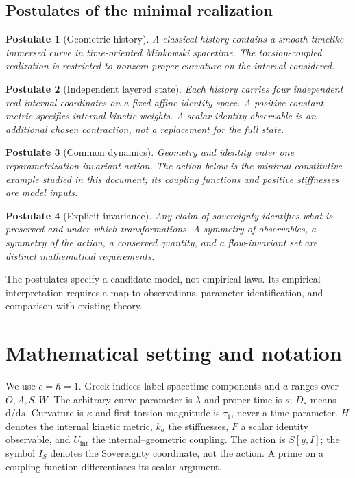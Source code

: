 \documentclass[11pt]{article}
\newcommand{\dd}{\mathrm d}
\newcommand{\Ds}{D_s}
\newcommand{\U}{U_{\mathrm{int}}}
\newtheorem{postulate}{Postulate}
\begin{document}
\subsection{Postulates of the minimal realization}
\begin{postulate}[Geometric history]
A classical history contains a smooth timelike immersed curve in time-oriented Minkowski spacetime. The torsion-coupled realization is restricted to nonzero proper curvature on the interval considered.
\end{postulate}
\begin{postulate}[Independent layered state]
Each history carries four independent real internal coordinates on a fixed affine identity space. A positive constant metric specifies internal kinetic weights. A scalar identity observable is an additional chosen contraction, not a replacement for the full state.
\end{postulate}
\begin{postulate}[Common dynamics]
Geometry and identity enter one reparametrization-invariant action. The action below is the minimal constitutive example studied in this document; its coupling functions and positive stiffnesses are model inputs.
\end{postulate}
\begin{postulate}[Explicit invariance]
Any claim of sovereignty identifies what is preserved and under which transformations. A symmetry of observables, a symmetry of the action, a conserved quantity, and a flow-invariant set are distinct mathematical requirements.
\end{postulate}
The postulates specify a candidate model, not empirical laws. Its empirical interpretation requires a map to observations, parameter identification, and comparison with existing theory.

\section{Mathematical setting and notation}
We use $c=\hbar=1$. Greek indices label spacetime components and $a$ ranges over $O,A,S,W$. The arbitrary curve parameter is $\lambda$ and proper time is $s$; $\Ds$ means $\dd/\dd s$. Curvature is $\kappa$ and first torsion magnitude is $\tau_1$, never a time parameter. $H$ denotes the internal kinetic metric, $k_a$ the stiffnesses, $F$ a scalar identity observable, and $\U$ the internal--geometric coupling. The action is $S[y,I]$; the symbol $I_S$ denotes the Sovereignty coordinate, not the action. A prime on a coupling function differentiates its scalar argument.
\end{document}

